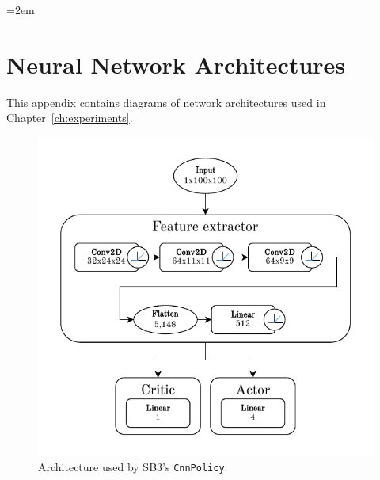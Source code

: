 \documentclass[
  digital,     %
  oneside,     %
  nosansbold,  %
  nocolorbold, %
  lof,         %
  lot,         %
]{fithesis4}
\begin{document}
\begingroup
\emergencystretch=2em
\printbibliography[heading=bibintoc] %
\endgroup


\appendix %
\chapter{Neural Network Architectures}
This appendix contains diagrams of network architectures used in Chapter~\ref{ch:experiments}.

\begin{figure}[h]
    \includegraphics[width=1\linewidth]{diagrams/cnn_arch.pdf}
    \caption{Architecture used by SB3's \texttt{CnnPolicy}.}
    \label{fig:cnn_policy}
\end{figure}
\end{document}
